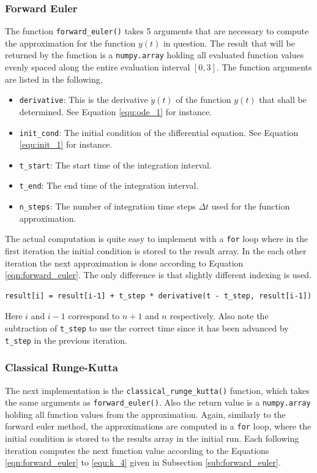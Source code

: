 \documentclass{aa}
\begin{document}
\subsubsection*{Forward Euler}%
\label{ssub:forward_euler}
The function \verb+forward_euler()+ takes 5 arguments that are necessary to compute the
approximation for the function \(y(t)\) in question. The result that will be returned by the
function is a \verb+numpy.array+ holding all evaluated function values evenly spaced along the
entire evaluation interval \([0,3]\). The function arguments are listed in the following.
\begin{itemize}
    \item \verb+derivative+: This is the derivative \(\dot{y}(t)\) of the function \(y(t)\)
        that shall be determined. See Equation \ref{equ:ode_1} for instance.
    \item \verb+init_cond+: The initial condition of the differential equation. See Equation
        \ref{equ:init_1} for instance.
    \item \verb+t_start+: The start time of the integration interval.
    \item \verb+t_end+: The end time of the integration interval.
    \item \verb+n_steps+: The number of integration time steps \(\Delta t\) used for the
        function approximation.
\end{itemize}
The actual computation is quite easy to implement with a \verb+for+ loop where in the first
iteration the initial condition is stored to the result array. In the each other iteration the
next approximation is done according to Equation \ref{eqn:forward_euler}. The only difference
is that slightly different indexing is used.
\begin{lstlisting}[firstnumber=187, name=ode_solvers]
result[i] = result[i-1] + t_step * derivative(t - t_step, result[i-1])
\end{lstlisting}
Here \(i\) and \(i-1\) correspond to \(n+1\) and \(n\) respectively. Also note the subtraction
of \verb+t_step+ to use the correct time since it has been advanced by \verb+t_step+ in the
previous iteration.

\subsubsection*{Classical Runge-Kutta}%
\label{ssub:classical_runge_kutta}
The next implementation is the \verb+classical_runge_kutta()+ function, which takes the same
arguments as \verb+forward_euler()+. Also the return value is a \verb+numpy.array+ holding all
function values from the approximation. Again, similarly to the forward euler method, the
approximations are computed in a \verb+for+ loop, where the initial condition is stored to the
results array in the initial run. Each following iteration computes the next function value
according to the Equations \ref{eqn:forward_euler} to \ref{equ:k_4} given in Subsection
\ref{sub:forward_euler}.
\end{document}
